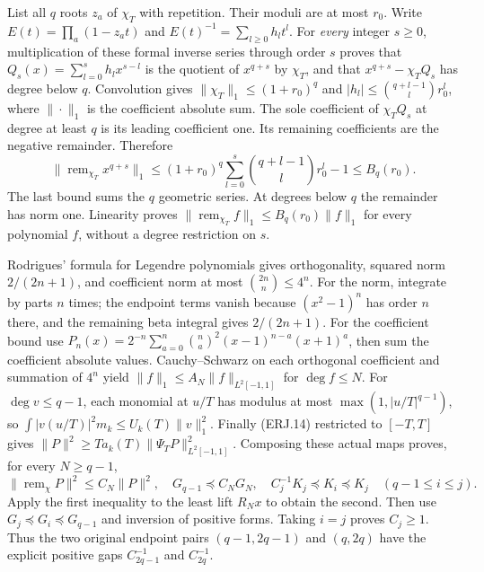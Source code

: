 \documentclass[11pt]{article}
\begin{document}
List all $q$ roots $z_a$ of $\chi_T$ with repetition. Their moduli
are at most $r_0$. Write
$E(t)=\prod_a(1-z_at)$ and $E(t)^{-1}=\sum_{l\ge0}h_lt^l$.
For \emph{every} integer $s\ge0$, multiplication of these formal
inverse series through order $s$ proves that
$Q_s(x)=\sum_{l=0}^sh_lx^{s-l}$ is the quotient of $x^{q+s}$
by $\chi_T$, and that $x^{q+s}-\chi_TQ_s$ has degree below $q$.
Convolution gives $\|\chi_T\|_1\le(1+r_0)^q$ and
$|h_l|\le\binom{q+l-1}{l}r_0^l$, where $\|\cdot\|_1$
is the coefficient absolute sum. The sole coefficient of
$\chi_TQ_s$ at degree at least $q$ is its leading coefficient one.
Its remaining coefficients are the negative remainder. Therefore
\[
 \|\operatorname{rem}_{\chi_T}x^{q+s}\|_1
 \le(1+r_0)^q\sum_{l=0}^s\binom{q+l-1}{l}r_0^l-1
 \le B_q(r_0).\tag{ERJ.16}
\]
The last bound sums the $q$ geometric series. At degrees below $q$
the remainder has norm one. Linearity proves
$\|\operatorname{rem}_{\chi_T}f\|_1\le B_q(r_0)\|f\|_1$
for every polynomial $f$, without a degree restriction on $s$.

Rodrigues' formula for Legendre polynomials gives orthogonality,
squared norm $2/(2n+1)$, and coefficient norm at most
$\binom{2n}{n}\le4^n$. For the norm, integrate by parts $n$ times;
the endpoint terms vanish because $(x^2-1)^n$ has order $n$ there,
and the remaining beta integral gives $2/(2n+1)$. For the coefficient
bound use
$P_n(x)=2^{-n}\sum_{a=0}^n\binom na^2(x-1)^{n-a}(x+1)^a$,
then sum the coefficient absolute values. Cauchy--Schwarz on each
orthogonal coefficient and summation of $4^n$ yield
$\|f\|_1\le A_N\|f\|_{L^2[-1,1]}$ for $\deg f\le N$.
For $\deg v\le q-1$, each monomial at $u/T$ has modulus at most
$\max(1,|u/T|^{q-1})$, so
$\int|v(u/T)|^2m_k\le U_k(T)\|v\|_1^2$.
Finally (ERJ.14) restricted to $[-T,T]$ gives
$\|P\|^2\ge T a_k(T)\|\Psi_TP\|_{L^2[-1,1]}^2$.
Composing these actual maps proves, for every $N\ge q-1$,
\[
 \|\operatorname{rem}_\chi P\|^2\le C_N\|P\|^2,
 \quad G_{q-1}\preceq C_NG_N,
 \quad C_j^{-1}K_j\preceq K_i\preceq K_j
 \quad(q-1\le i\le j).\tag{ERJ.17}
\]
Apply the first inequality to the least lift $R_Nx$ to obtain the
second. Then use $G_j\preceq G_i\preceq G_{q-1}$ and inversion
of positive forms. Taking $i=j$ proves $C_j\ge1$.
Thus the two original endpoint pairs $(q-1,2q-1)$ and $(q,2q)$
have the explicit positive gaps $C_{2q-1}^{-1}$ and $C_{2q}^{-1}$.
\end{document}

